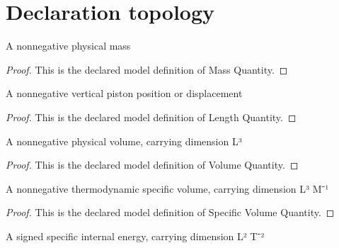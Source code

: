 \section{Declaration topology}
\begin{definition}
  \label{def:physics:phyx-mini-0452:phyxminiproblems-problemphyxmini0452-massquantity}
  A nonnegative physical mass
\end{definition}
\begin{proof}
  This is the declared model definition of Mass Quantity.
\end{proof}
\begin{definition}
  \label{def:physics:phyx-mini-0452:phyxminiproblems-problemphyxmini0452-lengthquantity}
  A nonnegative vertical piston position or displacement
\end{definition}
\begin{proof}
  This is the declared model definition of Length Quantity.
\end{proof}
\begin{definition}
  \label{def:physics:phyx-mini-0452:phyxminiproblems-problemphyxmini0452-volumequantity}
  A nonnegative physical volume, carrying dimension L³
\end{definition}
\begin{proof}
  This is the declared model definition of Volume Quantity.
\end{proof}
\begin{definition}
  \label{def:physics:phyx-mini-0452:phyxminiproblems-problemphyxmini0452-specificvolumequantity}
  A nonnegative thermodynamic specific volume, carrying dimension L³ M⁻¹
\end{definition}
\begin{proof}
  This is the declared model definition of Specific Volume Quantity.
\end{proof}
\begin{definition}
  \label{def:physics:phyx-mini-0452:phyxminiproblems-problemphyxmini0452-specificenergyquantity}
  A signed specific internal energy, carrying dimension L² T⁻²
\end{definition}

